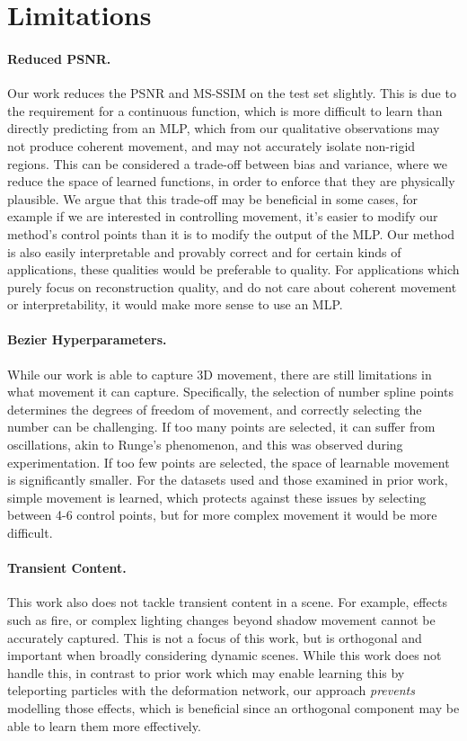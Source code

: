 \section*{Limitations}

\paragraph{Reduced PSNR.} Our work reduces the PSNR and MS-SSIM on the test set slightly. This is due to the requirement for a continuous function, which is more difficult to learn than directly predicting from an MLP, which from our qualitative observations may not produce coherent movement, and may not accurately isolate non-rigid regions. This can be considered a trade-off between bias and variance, where we reduce the space of learned functions, in order to enforce that they are physically plausible. We argue that this trade-off may be beneficial in some cases, for example if we are interested in controlling movement, it's easier to modify our method's control points than it is to modify the output of the MLP. Our method is also easily interpretable and provably correct and for certain kinds of applications, these qualities would be preferable to quality. For applications which purely focus on reconstruction quality, and do not care about coherent movement or interpretability, it would make more sense to use an MLP.

\paragraph{Bezier Hyperparameters.} While our work is able to capture 3D movement, there are still limitations in what movement it can capture. Specifically, the selection of number spline points determines the degrees of freedom of movement, and correctly selecting the number can be challenging. If too many points are selected, it can suffer from oscillations, akin to Runge's phenomenon, and this was observed during experimentation. If too few points are selected, the space of learnable movement is significantly smaller. For the datasets used and those examined in prior work, simple movement is learned, which protects against these issues by selecting between 4-6 control points, but for more complex movement it would be more difficult.

\paragraph{Transient Content.} This work also does not tackle transient content in a scene. For example, effects such as fire, or complex lighting changes beyond shadow movement cannot be accurately captured. This is not a focus of this work, but is orthogonal and important when broadly considering dynamic scenes. While this work does not handle this, in contrast to prior work which may enable learning this by teleporting particles with the deformation network, our approach \textit{prevents} modelling those effects, which is beneficial since an orthogonal component may be able to learn them more effectively.


